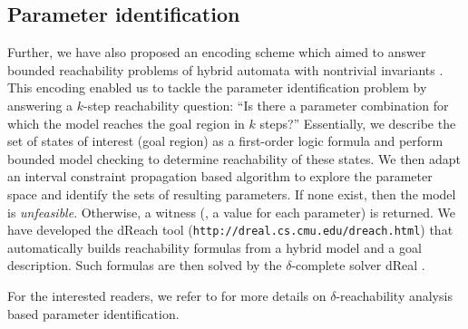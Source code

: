 \subsection{Parameter identification}
Further, we have also proposed an encoding scheme which aimed to answer bounded reachability problems of hybrid automata with nontrivial invariants \cite{liu14}. This encoding enabled us to tackle the parameter identification problem by answering a $k$-step reachability question: ``Is there a parameter
combination for which the model reaches the goal region in $k$ steps?'' Essentially, we describe the set of states of interest (goal region) as a first-order logic formula and perform bounded model checking \cite{BMC} to determine reachability of these states. We then adapt an interval constraint propagation based algorithm to explore the parameter space and identify the sets of resulting parameters. If none exist, then the model is 
{\em unfeasible}. Otherwise, a witness (\ie, a value for each parameter) is returned. We have developed the dReach tool \cite{dreach} (\verb#http://dreal.cs.cmu.edu/dreach.html#) that automatically builds reachability formulas from a hybrid model and a goal description. Such formulas are then solved by the $\delta$-complete solver dReal \citep{dreal}.

For the interested readers, we refer to %
\cite{liu14} for more details on %
$\delta$-reachability analysis based parameter identification.

